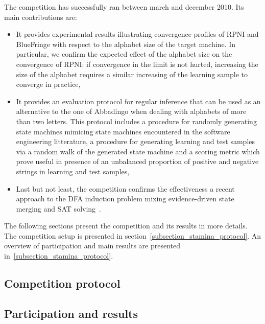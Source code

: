 The competition has successfully ran between march and december 2010. Its main contributions are:

\begin{itemize}
\item It provides experimental results illustrating convergence profiles of RPNI and BlueFringe with respect to the alphabet size of the target machine. In particular, we confirm the expected effect of the alphabet size on the convergence of RPNI: if convergence in the limit is not hurted, increasing the size of the alphabet requires a similar increasing of the learning sample to converge in practice,
\item It provides an evaluation protocol for regular inference that can be used as an alternative to the one of Abbadingo when dealing with alphabets of more than two letters. This protocol includes a procedure for randomly generating state machines mimicing state machines encountered in the software engineering litterature, a procedure for generating learning and test samples via a random walk of the generated state machine and a scoring metric which prove useful in presence of an unbalanced proportion of positive and negative strings in learning and test samples,
\item Last but not least, the competition confirms the effectiveness a recent approach to the DFA induction problem mixing evidence-driven state merging and SAT solving~\cite{Heule10}.
\end{itemize}

The following sections present the competition and its results in more details. The competition setup is presented in section~\ref{subsection_stamina_protocol}. An overview of participation and main results are presented in~\ref{subsection_stamina_protocol}.

\subsection{Competition protocol\label{subsection_stamina_protocol}}

\subsection{Participation and results\label{subsection_stamina_results}}

